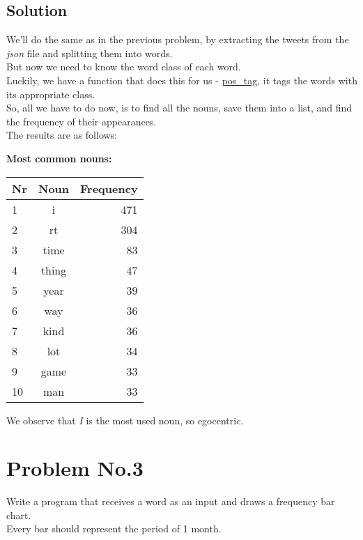 \documentclass{article}
\begin{document}
  \vspace{5em}

  \subsection{Solution}
    We'll do the same as in the previous problem, by extracting the tweets from
    the \emph{json} file and splitting them into words.\\
    But now we need to know the word class of each word.\\
    Luckily, we have a function that does this for us - \underline{pos\_tag},
    it tags the words with its appropriate class.\\
    So, all we have to do now, is to find all the nouns, save them into a list,
    and find the frequency of their appearances.\\
    The results are as follows:\\

    \begin{table}[H]
      \centering
      \textbf{Most common nouns:}\\
        \begin{tabular}{l|c|r}
          \hline
          Nr & Noun & Frequency \\ \hline
          1 & i & 471 \\ \hline
          2 & rt & 304 \\ \hline
          3 & time & 83 \\ \hline
          4 & thing & 47 \\ \hline
          5 & year & 39 \\ \hline
          6 & way & 36 \\ \hline
          7 & kind & 36 \\ \hline
          8 & lot & 34 \\ \hline
          9 & game & 33 \\ \hline
          10 & man & 33 \\
      \end{tabular}
    \end{table}

    We observe that \emph{I} is the most used noun, so egocentric.

    \newpage


    \section{Problem No.3}
    Write a program that receives a word as an input and draws a frequency bar chart.\\
    Every bar should represent the period of 1 month.\\
\end{document}
